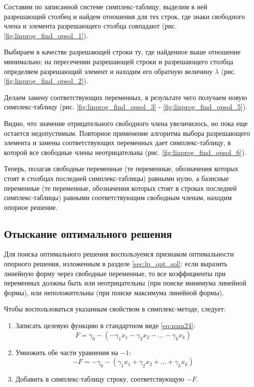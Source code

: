 \documentclass[a4paper,12pt]{report}
\begin{document}
Составим по записанной системе симплекс-таблицу, выделим в ней разрешающий столбец и найдем отношения для тех строк, где знаки свободного члена и элемента разрешающего столбца совпадают (рис. \ref{fig:linprog_find_opsol_1}).

Выбираем в качестве разрешающей строки ту, где найденное выше отношение минимально; на пересечении разрешающей строки и разрешающего столбца определяем разрешающий элемент и находим его обратную величину $\lambda$ (рис. \ref{fig:linprog_find_opsol_2}).

Делаем замену соответствующих переменных, в результате чего получаем новую симплекс-таблицу (рис. \ref{fig:linprog_find_opsol_3} - \ref{fig:linprog_find_opsol_5}).

Видно, что значение отрицательного свободного члена увеличилось, но пока еще остается недопустимым. Повторное применение алгоритма выбора разрешающего элемента и замены соответствующих переменных дает симплекс-таблицу, в которой все свободные члены неотрицательны (рис. \ref{fig:linprog_find_opsol_6}).

Теперь, полагая свободные переменные (те переменные, обозначения которых стоят в столбцах последней симплекс-таблицы) равными нулю, а базисные переменные (те переменные, обозначения которых стоят в строках последней симплекс-таблицы) равными соответствующим свободным членам, находим опорное решение.

\subsection{Отыскание оптимального решения}
\label{sec:search_opt_sol}
Для поиска оптимального решения воспользуемся признаком оптимальности опорного решения, изложенным в разделе \ref{sec:lp_opt_sol}: если выразить линейную форму через свободные переменные, то все коэффициенты при переменных должны быть или неотрицательны (при поиске минимума линейной формы), или неположительны (при поиске максимума линейной формы).

Чтобы воспользоваться указанным свойством в симплекс-методе, следует:
\begin{enumerate}
\item Записать целевую функцию в стандартном виде \eqref{eq:num24}:
\begin{equation*}
F = \gamma_{0} - (-\gamma_{1}x_{1} - \gamma_{2}x_{2} - \ldots - \gamma_{k}x_{k})
\end{equation*}
\item Умножить обе части уравнения на $-1$:
\begin{equation*}
-F = -\gamma_{0} - (\gamma_{1}x_{1} + \gamma_{2}x_{2} + \ldots + \gamma_{k}x_{k})
\end{equation*}
\item Добавить в симплекс-таблицу строку, соответствующую $-F$.
\end{enumerate}
\end{document}
